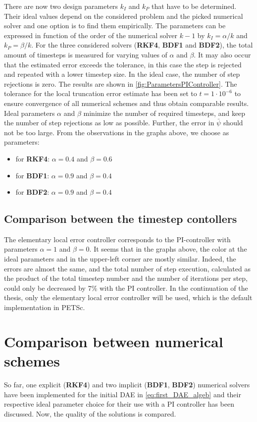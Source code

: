 There are now two design parameters $k_I$ and $k_P$ that have to be determined. Their ideal values depend on the considered problem and the picked numerical solver and one option is to find them empirically. The parameters can be expressed in function of the order of the numerical solver $k-1$ by $k_I = \alpha / k$ and $k_P = \beta / k$. For the three considered solvers (\textbf{RKF4}, \textbf{BDF1} and \textbf{BDF2}), the total amount of timesteps is measured for varying values of $\alpha$ and $\beta$. It may also occur that the estimated error exceeds the tolerance, in this case the step is rejected and repeated with a lower timestep size. In the ideal case, the number of step rejections is zero. The results are shown in \autoref{fig:ParametersPIController}. The tolerance for the local truncation error estimate has been set to $t=1\cdot 10^{-6}$ to ensure convergence of all numerical schemes and thus obtain comparable results. \\

Ideal parameters $\alpha$ and $\beta$ minimize the number of required timesteps, and keep the number of step rejections as low as possible. Further, the error in $\bar{\psi}$ should not be too large. From the observations in the graphs above, we choose as parameters:
\begin{itemize}
    \item for \textbf{RKF4}: $\alpha=0.4$ and $\beta=0.6$
    \item for \textbf{BDF1}: $\alpha=0.9$ and $\beta=0.4$
    \item for \textbf{BDF2}: $\alpha=0.9$ and $\beta=0.4$
\end{itemize}

\subsection{Comparison between the timestep contollers}
The elementary local error controller corresponds to the PI-controller with parameters $\alpha = 1$ and $\beta=0$. It seems that in the graphs above, the color at the ideal parameters and in the upper-left corner are mostly similar. Indeed, the errors are almost the same, and the total number of step execution, calculated as the product of the total timestep number and the number of iterations per step, could only be decreased by 7\% with the PI controller. In the continuation of the thesis, only the elementary local error controller will be used, which is the default implementation in PETSc. 

\section{Comparison between numerical schemes}
So far, one explicit (\textbf{RKF4}) and two implicit (\textbf{BDF1}, \textbf{BDF2}) numerical solvers have been implemented for the initial DAE in \autoref{eq:first_DAE_algeb} and their respective ideal parameter choice for their use with a PI controller has been discussed. Now, the quality of the solutions is compared. \\

